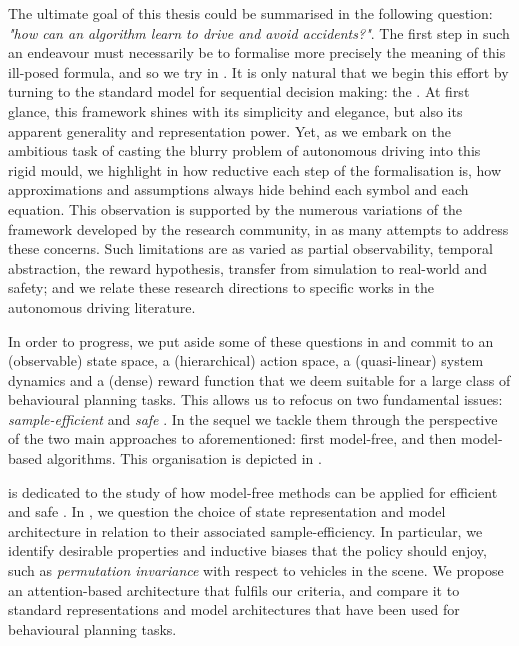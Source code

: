 The ultimate goal of this thesis could be summarised in the following question: \emph{"how can an algorithm learn to drive and avoid accidents?"}. The first step in such an endeavour must necessarily be to formalise more precisely the meaning of this ill-posed formula, and so we try in \textbf{}.
It is only natural that we begin this effort by turning to the standard model for sequential decision making: the . At first glance, this framework shines with its simplicity and elegance, but also its apparent generality and representation power. Yet, as we embark on the ambitious task of casting the blurry problem of autonomous driving into this rigid mould, we highlight in \textbf{} how reductive each step of the formalisation is, how approximations and assumptions always hide behind each symbol and each equation. This observation is supported by the numerous variations of the framework developed by the research community, in as many attempts to address these concerns. Such limitations are as varied as partial observability, temporal abstraction, the reward hypothesis, transfer from simulation to real-world and safety; and we relate these research directions to specific works in the autonomous driving literature.

In order to progress, we put aside some of these questions in \textbf{} and commit to an (observable) state space, a (hierarchical) action space, a (quasi-linear) system dynamics and a (dense) reward function that we deem suitable for a large class of behavioural planning tasks. This allows us to refocus on two fundamental issues: \textit{sample-efficient} and \textit{safe} . In the sequel we tackle them through the perspective of the two main approaches to  aforementioned: first model-free, and then model-based algorithms. This organisation is depicted in .

\textbf{} is dedicated to the study of how model-free methods can be applied for efficient and safe . In \textbf{}, we question the choice of state representation and model architecture in relation to their associated sample-efficiency. In particular, we identify desirable properties and inductive biases that the policy should enjoy, such as \emph{permutation invariance} with respect to vehicles in the scene. We propose an attention-based architecture that fulfils our criteria, and compare it to standard representations and model architectures that have been used for behavioural planning tasks. 

